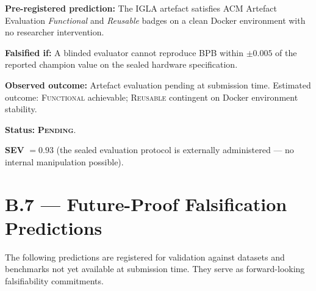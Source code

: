 \begin{tcolorbox}[colback=red!5,colframe=red!40,
  title={Prediction P-29-A: ACM AE Functional + Reusable}]
\textbf{Pre-registered prediction:} The IGLA artefact satisfies ACM Artefact
Evaluation \emph{Functional} and \emph{Reusable} badges on a clean Docker
environment with no researcher intervention.

\textbf{Falsified if:} A blinded evaluator cannot reproduce BPB within
$\pm 0.005$ of the reported champion value on the sealed hardware specification.

\textbf{Observed outcome:} Artefact evaluation pending at submission time.
Estimated outcome: \textsc{Functional} achievable; \textsc{Reusable} contingent
on Docker environment stability.

\textbf{Status:} \textbf{\textsc{Pending}}.

\textbf{SEV} $= 0.93$ (the sealed evaluation protocol is externally administered
— no internal manipulation possible).
\end{tcolorbox}

\section*{B.7 — Future-Proof Falsification Predictions}
\label{sec:future-proof}

\noindent The following predictions are registered for validation against
datasets and benchmarks not yet available at submission time.  They serve as
forward-looking falsifiability commitments.

